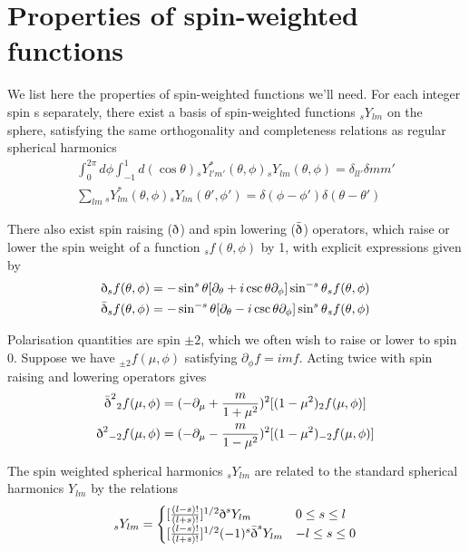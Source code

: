 \documentclass[a4paper,10pt]{article}
\newcommand{\sr}{\text{\normalfont\dh}}
\renewcommand{\sl}{\bar{\text{\normalfont\dh}}}
\begin{document}
\section{Properties of spin-weighted functions}
\label{swf}

We list here the properties of spin-weighted functions we'll need. For each integer spin s separately, there exist a basis of spin-weighted functions $_sY_{lm}$ on the sphere, satisfying the same orthogonality and completeness relations as regular spherical harmonics
\begin{equation}
\begin{split}
\int_0^{2\pi} d\phi \int_{-1}^{1} d(\cos{\theta}) {}_sY_{l'm'}^*(\theta,\phi){}_sY_{lm}(\theta,\phi) = \delta_{ll'}\delta{mm'} \\
\sum_{lm} {}_sY_{lm}^*(\theta,\phi){}_sY_{lm}(\theta',\phi')=\delta(\phi-\phi')\delta(\theta-\theta')
\end{split}
\end{equation}

There also exist spin raising ($\sr$) and spin lowering ($\sl$) operators, which raise or lower the spin weight of a function $_sf(\theta,\phi)$ by 1, with explicit expressions given by
\begin{equation}\begin{split}
\sr {}_sf(\theta, \phi) &= -\sin^s{\theta}[\partial_\theta+i\csc{\theta}\partial_\phi]\sin^{-s}{\theta}{}_sf(\theta, \phi)\\
\sl {}_sf(\theta, \phi) &= -\sin^{-s}{\theta}[\partial_\theta-i\csc{\theta}\partial_\phi]\sin^{s}{\theta}{}_sf(\theta, \phi)
\label{explicitspinraiselower}
\end{split}\end{equation}

Polarisation quantities are spin $\pm 2$, which we often wish to raise or lower to spin 0. Suppose we have ${}_{\pm2}f(\mu,\phi)$ satisfying $\partial_\phi{}f=imf$. Acting twice with spin raising and lowering operators gives
\begin{equation}\begin{split}
\sl^2{}_2f(\mu, \phi) &= (-\partial_\mu+\frac{m}{1+\mu^2})^2[(1-\mu^2)_2f(\mu,\phi)]\\
\sr^2{}_{-2}f(\mu, \phi) &= (-\partial_\mu-\frac{m}{1-\mu^2})^2[(1-\mu^2)_{-2}f(\mu,\phi)]
\label{+-2}
\end{split}\end{equation}

The spin weighted spherical harmonics $_sY_{lm}$ are related to the standard spherical harmonics $Y_{lm}$ by the relations
\begin{equation}
_sY_{lm} = 
\begin{cases}
[\frac{(l-s)!}{(l+s)!}]^{1/2}\sr^s Y_{lm} & 0\leq s\leq l\\
[\frac{(l-s)!}{(l+s)!}]^{1/2}(-1)^s\sl^s Y_{lm} & -l\leq s\leq 0
\end{cases}
\end{equation}
\end{document}
